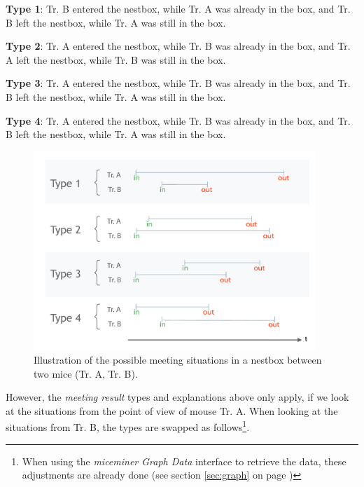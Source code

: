 \begin{mydesc}
\label{list:meeting_types}
\item \textbf{Type 1}: Tr. B entered the nestbox, while Tr. A was already in the box, and Tr. B left the nestbox, while Tr. A was still in the box. 
\item \textbf{Type 2}: Tr. A entered the nestbox, while Tr. B was already in the box, and Tr. A left the nestbox, while Tr. B was still in the box. 
\item \textbf{Type 3}: Tr. A entered the nestbox, while Tr. B was already in the box, and Tr. B left the nestbox, while Tr. A was still in the box. 
\item \textbf{Type 4}: Tr. A entered the nestbox, while Tr. B was already in the box, and Tr. B left the nestbox, while Tr. A was still in the box. 
\end{mydesc}

\begin{figure}[htpb]
\begin{center}
  \includegraphics[width=0.95\textwidth]{assets/pdf/meeting_types_schema.pdf}
  \caption[Meeting results types illustration]{Illustration of the possible meeting situations in a nestbox between two mice (Tr. A, Tr. B).}
  \label{fig:meeting_types}
\end{center}
\end{figure}

However, the \textit{meeting result} types and explanations above only apply, if we look at the situations from the point of view of mouse Tr. A. When looking at the situations from Tr. B, the types are swapped as follows\footnote{When using the \textit{miceminer Graph Data} interface to retrieve the data, these adjustments are already done (see section \ref{sec:graph} on page \pageref{sec:graph})}.


